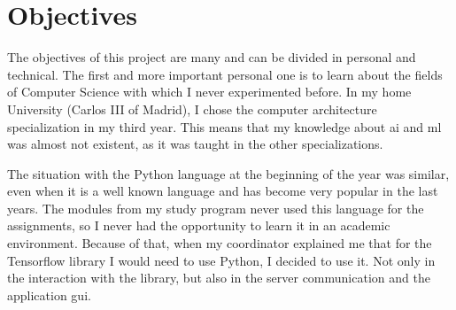 %
%

\section{Objectives}
The objectives of this project are many and can be divided in personal and technical. The first and more important personal one is to learn about the fields of Computer Science with which I never experimented before. In my home University (Carlos III of Madrid), I chose the computer architecture specialization in my third year. This means that my knowledge about \gls{ai} and \gls{ml} was almost not existent, as it was taught in the other specializations. 

The situation with the Python language at the beginning of the year was similar, even when it is a well known language and has become very popular in the last years. The modules from my study program never used this language for the assignments, so I never had the opportunity to learn it in an academic environment. Because of that, when my coordinator explained me that for the Tensorflow library I would need to use Python, I decided to use it. Not only in the interaction with the library, but also in the server communication and the application \gls{gui}.

